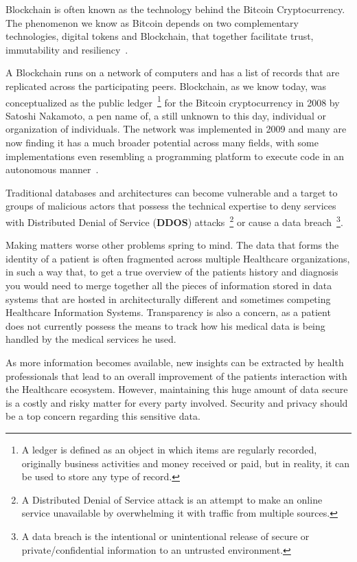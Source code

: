 Blockchain is often known as the technology behind the Bitcoin Cryptocurrency.
The phenomenon we know as Bitcoin depends on two complementary technologies,
digital tokens and Blockchain, that together facilitate trust, immutability and
resiliency~\cite{Evans2016}.

A Blockchain runs on a network of computers and has a list of records that are
replicated across the participating peers. Blockchain, as we know today, was
conceptualized as the public ledger~\footnote{A ledger is defined as an object
in which items are regularly recorded, originally business activities and money
received or paid, but in reality, it can be used to store any type of record.}
for the Bitcoin cryptocurrency in 2008 by Satoshi Nakamoto, a pen name of, a
still unknown to this day, individual or organization of individuals. The
network was implemented in 2009 and many are now finding it has a much broader
potential across many fields, with some implementations even resembling a
programming platform to execute code in an autonomous
manner~\cite{Nakamoto2008}.

Traditional databases and architectures can become vulnerable and a target to
groups of malicious actors that possess the technical expertise to deny
services with Distributed Denial of Service (\textbf{DDOS}) attacks~\footnote{A
Distributed Denial of Service attack is an attempt to make an online service
unavailable by overwhelming it with traffic from multiple sources.} or cause a
data breach~\footnote{A data breach is the intentional or unintentional release
of secure or private/confidential information to an untrusted environment.}. 

Making matters worse other problems spring to mind. The data that forms the
identity of a patient is often fragmented across multiple Healthcare
organizations, in such a way that, to get a true overview of the patients
history and diagnosis you would need to merge together all the pieces of
information stored in data systems that are hosted in architecturally different
and sometimes competing Healthcare Information Systems. Transparency is also a
concern, as a patient does not currently possess the means to track how his
medical data is being handled by the medical services he used.

As more information becomes available, new insights can be extracted by health
professionals that lead to an overall improvement of the patients interaction
with the Healthcare ecosystem. However, maintaining this huge amount of data
secure is a costly and risky matter for every party involved. Security and
privacy should be a top concern regarding this sensitive data. 

